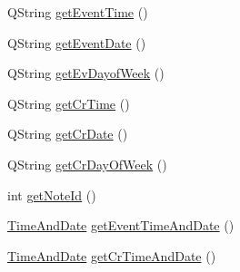 \begin{DoxyCompactItemize}
\item 
Q\+String \hyperlink{classMattyNote_a8c7f06ff44ce23f5a9ce6d2364732a24}{get\+Event\+Time} ()
\item 
Q\+String \hyperlink{classMattyNote_a8973578029ab29593061cca235ae84f9}{get\+Event\+Date} ()
\item 
Q\+String \hyperlink{classMattyNote_ac6f675c525f027536fdcfda43f0a261e}{get\+Ev\+Dayof\+Week} ()
\item 
Q\+String \hyperlink{classMattyNote_a2acf19aded7d4b5c29db7af6b0c4b1f6}{get\+Cr\+Time} ()
\item 
Q\+String \hyperlink{classMattyNote_ade5ef053d6d9ba158d9842feadd39754}{get\+Cr\+Date} ()
\item 
Q\+String \hyperlink{classMattyNote_a92dca9930c5f9b00991a780fc89acb8f}{get\+Cr\+Day\+Of\+Week} ()
\item 
int \hyperlink{classMattyNote_ad7c5837f61e4813005ae063c67b9a0f0}{get\+Note\+Id} ()
\item 
\hyperlink{structTimeAndDate}{Time\+And\+Date} \hyperlink{classMattyNote_ac2579a4c26f27c8d86b6a57c81f5dc3b}{get\+Event\+Time\+And\+Date} ()
\item 
\hyperlink{structTimeAndDate}{Time\+And\+Date} \hyperlink{classMattyNote_aff50eb125d7a0a64ac3fb21f056ec745}{get\+Cr\+Time\+And\+Date} ()
\end{DoxyCompactItemize}

